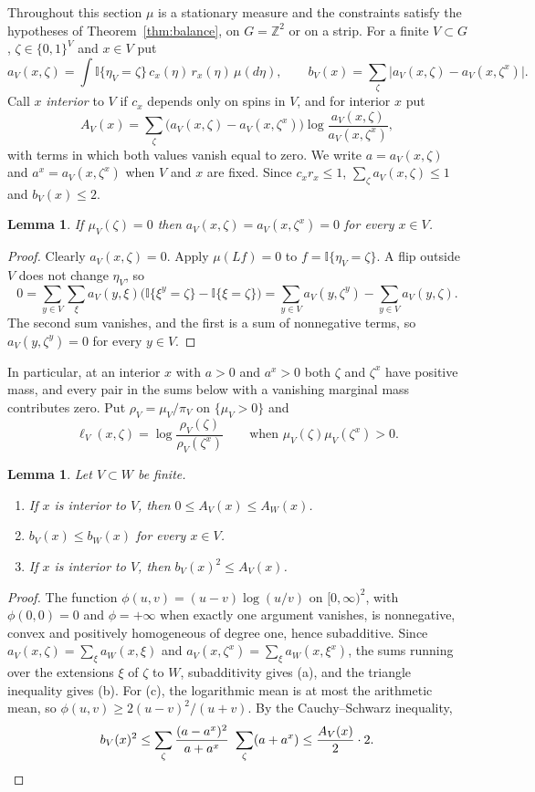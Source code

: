 \documentclass[11pt]{amsart}
\newtheorem{lemma}[theorem]{Lemma}
\theoremstyle{remark}
\newcommand{\Z}{\mathbb{Z}}
\begin{document}
Throughout this section $\mu$ is a stationary measure and the constraints satisfy the hypotheses of
Theorem~\ref{thm:balance}, on $G=\Z^2$ or on a strip. For a finite $V\subset G$, $\zeta\in\{0,1\}^V$ and $x\in V$ put
\[
a_V(x,\zeta)=\int\mathbb I\{\eta_V=\zeta\}\,c_x(\eta)\,r_x(\eta)\,\mu(d\eta),\qquad
b_V(x)=\sum_{\zeta}\bigl|a_V(x,\zeta)-a_V(x,\zeta^x)\bigr|.
\]
Call $x$ \emph{interior} to $V$ if $c_x$ depends only on spins in $V$, and for interior $x$ put
\[
A_V(x)=\sum_\zeta\bigl(a_V(x,\zeta)-a_V(x,\zeta^x)\bigr)\log\frac{a_V(x,\zeta)}{a_V(x,\zeta^x)},
\]
with terms in which both values vanish equal to zero. We write $a=a_V(x,\zeta)$ and $a^x=a_V(x,\zeta^x)$ when $V$ and
$x$ are fixed. Since $c_xr_x\le1$, $\sum_\zeta a_V(x,\zeta)\le1$ and $b_V(x)\le2$.

\begin{lemma}\label{lem:zero}
If $\mu_V(\zeta)=0$ then $a_V(x,\zeta)=a_V(x,\zeta^x)=0$ for every $x\in V$.
\end{lemma}

\begin{proof}
Clearly $a_V(x,\zeta)=0$. Apply $\mu(Lf)=0$ to $f=\mathbb I\{\eta_V=\zeta\}$. A flip outside $V$ does not change
$\eta_V$, so
\[
0=\sum_{y\in V}\sum_{\xi}a_V(y,\xi)\bigl(\mathbb I\{\xi^y=\zeta\}-\mathbb I\{\xi=\zeta\}\bigr)
=\sum_{y\in V}a_V(y,\zeta^y)-\sum_{y\in V}a_V(y,\zeta).
\]
The second sum vanishes, and the first is a sum of nonnegative terms, so $a_V(y,\zeta^y)=0$ for every $y\in V$.
\end{proof}

In particular, at an interior $x$ with $a>0$ and $a^x>0$ both $\zeta$ and $\zeta^x$ have positive mass, and every
pair in the sums below with a vanishing marginal mass contributes zero. Put $\rho_V=\mu_V/\pi_V$ on
$\{\mu_V>0\}$ and
\[
\ell_V(x,\zeta)=\log\frac{\rho_V(\zeta)}{\rho_V(\zeta^x)}\qquad\text{when }\mu_V(\zeta)\mu_V(\zeta^x)>0 .
\]

\begin{lemma}\label{lem:abc}
Let $V\subset W$ be finite.
\begin{enumerate}
\item[(a)] If $x$ is interior to $V$, then $0\le A_V(x)\le A_W(x)$.
\item[(b)] $b_V(x)\le b_W(x)$ for every $x\in V$.
\item[(c)] If $x$ is interior to $V$, then $b_V(x)^2\le A_V(x)$.
\end{enumerate}
\end{lemma}

\begin{proof}
The function $\phi(u,v)=(u-v)\log(u/v)$ on $[0,\infty)^2$, with $\phi(0,0)=0$ and $\phi=+\infty$ when exactly one
argument vanishes, is nonnegative, convex and positively homogeneous of degree one, hence subadditive. Since
$a_V(x,\zeta)=\sum_\xi a_W(x,\xi)$ and $a_V(x,\zeta^x)=\sum_\xi a_W(x,\xi^x)$, the sums running over the extensions
$\xi$ of $\zeta$ to $W$, subadditivity gives (a), and the triangle inequality gives (b). For (c), the logarithmic mean
is at most the arithmetic mean, so $\phi(u,v)\ge2(u-v)^2/(u+v)$. By the Cauchy--Schwarz inequality,
\[
b_V(x)^2\le\sum_\zeta\frac{(a-a^x)^2}{a+a^x}\ \sum_\zeta(a+a^x)\le\frac{A_V(x)}2\cdot2 .\qedhere
\]
\end{proof}
\end{document}
